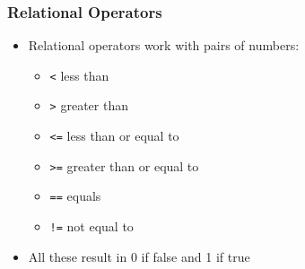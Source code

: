 \documentclass{article}
\begin{document}
		\subsubsection{Relational Operators}
			\begin{itemize}
				\item Relational operators work with pairs of numbers:
					\begin{itemize}
						\item \texttt{<} less than
						\item \texttt{>} greater than
						\item \texttt{<=} less than or equal to
						\item \texttt{>=} greater than or equal to
						\item \texttt{==} equals
						\item \texttt{!=} not equal to
					\end{itemize}
				\item All these result in 0 if false and 1 if true
			\end{itemize}
\end{document}
